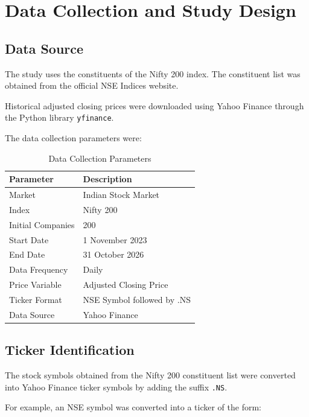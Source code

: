 \documentclass[11pt,a4paper]{article}
\begin{document}
\section{Data Collection and Study Design}

\subsection{Data Source}

The study uses the constituents of the Nifty 200 index.
The constituent list was obtained from the official NSE Indices
website.

Historical adjusted closing prices were downloaded using
Yahoo Finance through the Python library \texttt{yfinance}.

The data collection parameters were:

\begin{table}[H]
\centering
\caption{Data Collection Parameters}
\label{tab:data_parameters}
\begin{tabular}{ll}
\toprule
\textbf{Parameter} & \textbf{Description}\\
\midrule
Market & Indian Stock Market\\
Index & Nifty 200\\
Initial Companies & 200\\
Start Date & 1 November 2023\\
End Date & 31 October 2026\\
Data Frequency & Daily\\
Price Variable & Adjusted Closing Price\\
Ticker Format & NSE Symbol followed by .NS\\
Data Source & Yahoo Finance\\
\bottomrule
\end{tabular}
\end{table}

\subsection{Ticker Identification}

The stock symbols obtained from the Nifty 200 constituent list
were converted into Yahoo Finance ticker symbols by adding
the suffix \texttt{.NS}.

For example, an NSE symbol was converted into a ticker of the
form:
\end{document}
